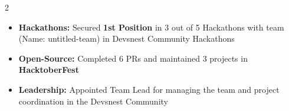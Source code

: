 \documentclass[10pt,a4paper,ragged2e,withhyper]{altacv}
\begin{document}
\begin{paracol}{2}
\begin{itemize}
		
	\end{itemize}
\vspace{5pt}
\vspace{-5pt}
\begin{itemize}
	\item \textbf{Hackathons:} Secured \textbf{1st Position} in 3
	out of 5 Hackathons with team (Name:
	untitled-team) in Devsnest Community
	Hackathons
	\item \textbf{Open-Source:} Completed 6 PRs and
	maintained 3 projects in \textbf{HacktoberFest}
	\item \textbf{Leadership:} Appointed Team Lead for
	managing the team and project
	coordination in the Devsnest
	Community
\end{itemize}

%


\end{paracol}
\end{document}
